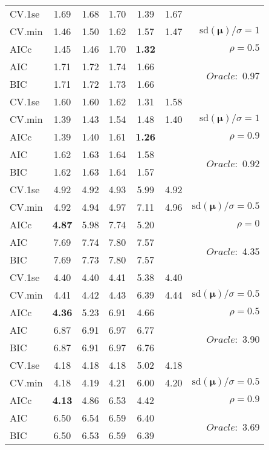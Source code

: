 \begin{table}
\begin{center}
\begin{tabular}{l*{5}{c}|r}
CV.1se & 1.69 & 1.68 & 1.70 & 1.39 & 1.67 & \\
CV.min & 1.46 & 1.50 & 1.62 & 1.57 & 1.47 &  $\mathrm{sd}(\mathbf{\mu})/\sigma=1$ \\
AICc & 1.45 & 1.46 & 1.70 & {\bf 1.32} & & $\rho=0.5$ \\
AIC & 1.71 & 1.72 & 1.74 & 1.66 & &  \multirow{2}{*}{$Oracle: $ 0.97} \\
BIC & 1.71 & 1.72 & 1.73 & 1.66 & &  \\
 \hline 
CV.1se & 1.60 & 1.60 & 1.62 & 1.31 & 1.58 & \\
CV.min & 1.39 & 1.43 & 1.54 & 1.48 & 1.40 &  $\mathrm{sd}(\mathbf{\mu})/\sigma=1$ \\
AICc & 1.39 & 1.40 & 1.61 & {\bf 1.26} & & $\rho=0.9$ \\
AIC & 1.62 & 1.63 & 1.64 & 1.58 & &  \multirow{2}{*}{$Oracle: $ 0.92} \\
BIC & 1.62 & 1.63 & 1.64 & 1.57 & &  \\
 \hline 
CV.1se & 4.92 & 4.92 & 4.93 & 5.99 & 4.92 & \\
CV.min & 4.92 & 4.94 & 4.97 & 7.11 & 4.96 &  $\mathrm{sd}(\mathbf{\mu})/\sigma=0.5$ \\
AICc & {\bf 4.87} & 5.98 & 7.74 & 5.20 & & $\rho=0$ \\
AIC & 7.69 & 7.74 & 7.80 & 7.57 & &  \multirow{2}{*}{$Oracle: $ 4.35} \\
BIC & 7.69 & 7.73 & 7.80 & 7.57 & &  \\
 \hline 
CV.1se & 4.40 & 4.40 & 4.41 & 5.38 & 4.40 & \\
CV.min & 4.41 & 4.42 & 4.43 & 6.39 & 4.44 &  $\mathrm{sd}(\mathbf{\mu})/\sigma=0.5$ \\
AICc & {\bf 4.36} & 5.23 & 6.91 & 4.66 & & $\rho=0.5$ \\
AIC & 6.87 & 6.91 & 6.97 & 6.77 & &  \multirow{2}{*}{$Oracle: $ 3.90} \\
BIC & 6.87 & 6.91 & 6.97 & 6.76 & &  \\
 \hline 
CV.1se & 4.18 & 4.18 & 4.18 & 5.02 & 4.18 & \\
CV.min & 4.18 & 4.19 & 4.21 & 6.00 & 4.20 &  $\mathrm{sd}(\mathbf{\mu})/\sigma=0.5$ \\
AICc & {\bf 4.13} & 4.86 & 6.53 & 4.42 & & $\rho=0.9$ \\
AIC & 6.50 & 6.54 & 6.59 & 6.40 & &  \multirow{2}{*}{$Oracle: $ 3.69} \\
BIC & 6.50 & 6.53 & 6.59 & 6.39 & &  \\
 \hline 
\end{tabular}
\end{center}
\vspace{-1cm}
\end{table}





